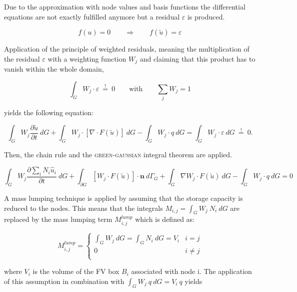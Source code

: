 Due to the approximation with node values and basis functions the differential equations are not exactly fulfilled anymore but a residual $\varepsilon$ is produced.

\begin{equation}
	f(u) = 0  \qquad \Rightarrow \qquad f(\tilde u) = \varepsilon
\end{equation}

Application of the principle of weighted residuals, meaning the multiplication of the residual $\varepsilon$ with a weighting function $W_j$  and claiming that this product has to vanish within the whole domain,

\begin{equation}
	\int_G W_j \cdot \varepsilon \: \overset {!}{=} \: 0 \qquad \textrm{with} \qquad \sum_j W_j =1
\end{equation}

yields the following equation:

\begin{equation}
	\int_G W_j \frac{\partial \tilde u}{\partial t} \: dG + \int_G W_j \cdot \left[ \nabla \cdot F(\tilde u) \right]  \: dG - \int_G W_j \cdot q \: dG = \int_G W_j \cdot \varepsilon \: dG \: \overset {!}{=} \: 0 .
\end{equation}

Then, the chain rule and the \textsc{green-gaussian} integral theorem are applied.

\begin{equation}
	\int_G W_j \frac{\partial \sum_i N_i \hat u_i}{\partial t} \: dG + \int_{\partial G}  \left[ W_j \cdot F(\tilde u)\right]  \cdot \mathbf n \: d\varGamma_G + \int_G  \nabla W_j \cdot F(\tilde u)  \: dG - \int_G W_j \cdot q \: dG = 0
\end{equation}

A mass lumping technique is applied by assuming that the storage capacity is reduced to the nodes. This means that the integrals $M_{i,j} = \int_G W_j \: N_i \: dG$ are replaced by the mass lumping term $M^{lump}_{i,j}$ which is defined as:

\begin{equation}
	 M^{lump}_{i,j} =\begin{cases} \int_G W_j \: dG = \int_G N_i \: dG = V_i &i = j\\
	0 &i \neq j\\
	         \end{cases}
\end{equation}

where $V_i$ is the volume of the FV box $B_i$ associated with node i. The application of this assumption in combination with $\int_G W_j \:q \: dG = V_i \: q$ yields


